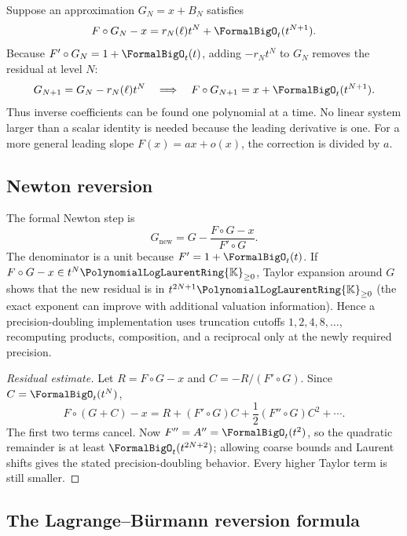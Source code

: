 \documentclass[11pt,oneside]{article}
\numberwithin{equation}{section}
\theoremstyle{definition}
\newcommand{\K}{\mathbb{K}}
\newcommand{\PL}{\PolynomialLogLaurentRing{\K}}
\begin{document}
Suppose an approximation \(G_N=x+B_N\) satisfies
\begin{equation}\label{eq:residual-order-N}
  F\circ G_N-x=r_N(\ell)t^N+\FormalBigO_t(t^{N+1}).
\end{equation}
Because \(F'\circ G_N=1+\FormalBigO_t(t)\), adding
\(-r_Nt^N\) to \(G_N\) removes the residual at level \(N\):
\begin{equation}\label{eq:triangular-update}
  G_{N+1}=G_N-r_N(\ell)t^N
  \quad\Longrightarrow\quad
  F\circ G_{N+1}=x+\FormalBigO_t(t^{N+1}).
\end{equation}
Thus inverse coefficients can be found one polynomial at a time.  No linear
system larger than a scalar identity is needed because the leading derivative is
one.  For a more general leading slope \(F(x)=ax+o(x)\), the correction is divided
by \(a\).

\subsection{Newton reversion}

The formal Newton step is
\begin{equation}\label{eq:newton-reversion}
\boxed{
  G_{\mathrm{new}}
  =G-\frac{F\circ G-x}{F'\circ G}.
}
\end{equation}
The denominator is a unit because \(F'=1+\FormalBigO_t(t)\).  If
\(F\circ G-x\in t^N\PL_{\ge0}\), Taylor expansion around \(G\) shows that the
new residual is in \(t^{2N+1}\PL_{\ge0}\) (the exact exponent can improve with
additional valuation information).  Hence a precision-doubling implementation
uses truncation cutoffs
\(1,2,4,8,\ldots\), recomputing products, composition, and a reciprocal only at
the newly required precision.

\begin{proof}[Residual estimate]
Let \(R=F\circ G-x\) and \(C=-R/(F'\circ G)\).  Since \(C=\FormalBigO_t(t^N)\),
\[
 F\circ(G+C)-x
 =R+(F'\circ G)C+\frac12(F''\circ G)C^2+\cdots.
\]
The first two terms cancel.  Now \(F''=A''=\FormalBigO_t(t^2)\), so the quadratic
remainder is at least \(\FormalBigO_t(t^{2N+2})\); allowing coarse bounds and Laurent
shifts gives the stated precision-doubling behavior.  Every higher Taylor term
is still smaller.
\end{proof}

\subsection{The Lagrange--B\"urmann reversion formula}
\end{document}
